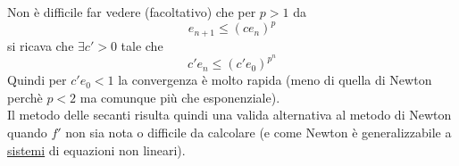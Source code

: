 \documentclass[12pt]{article}
\begin{document}
Non è difficile far vedere (facoltativo) che per $p>1$ da 
\begin{equation*}
    e_{n+1}\leq(ce_n)^{p}
\end{equation*}
si ricava che $\exists c'>0$ tale che
\begin{equation*}
    c'e_n\leq(c'e_0)^{p^n}
\end{equation*}
Quindi per $c'e_0<1$ la convergenza è molto rapida (meno di quella di Newton perchè $p<2$ ma comunque più che esponenziale).\\Il metodo delle secanti risulta quindi una valida alternativa al metodo di Newton quando $f'$ non sia nota o difficile da calcolare (e come Newton è generalizzabile a \underline{sistemi} di equazioni non lineari).
\end{document}
